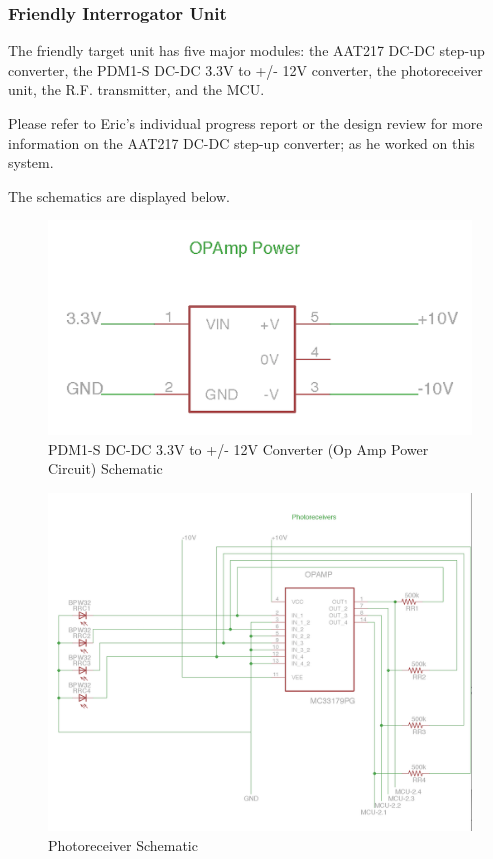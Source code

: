 \documentclass[letterpaper,10pt]{article}
\begin{document}
\begin{spacing}{1.15}
\subsubsection{Friendly Interrogator Unit}
The friendly target unit has five major modules: the AAT217 DC-DC step-up converter, the PDM1-S DC-DC 3.3V to +/- 12V converter, the photoreceiver unit, the R.F. transmitter, and the MCU. 

Please refer to Eric's individual progress report or the design review for more information on the AAT217 DC-DC step-up converter; as he worked on this system.
 
The schematics are displayed below.
\begin{figure} [H]
	\centering
	\includegraphics[scale=0.35]{opamp-power.png}
	\caption{PDM1-S DC-DC 3.3V to +/- 12V Converter (Op Amp Power Circuit) Schematic \label{fig:voltage-converter-schematic}}
\end{figure}

\begin{figure} [H]
	\centering
	\includegraphics[scale=0.7]{photoreceiver.png}
	\caption{Photoreceiver Schematic \label{fig:photoreceiver-schematic}}
\end{figure}


\end{spacing}
\end{document}
